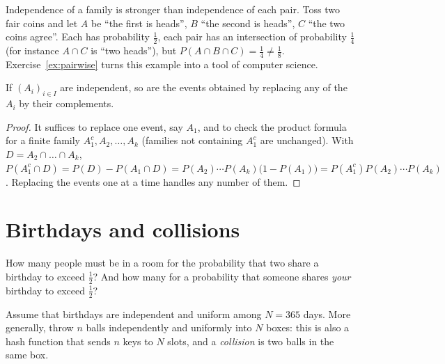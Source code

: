 Independence of a family is stronger than independence of each pair. Toss two fair coins and let $A$ be ``the
first is heads'', $B$ ``the second is heads'', $C$ ``the two coins agree''. Each has probability $\frac12$, each
pair has an intersection of probability $\frac14$ (for instance $A\cap C$ is ``two heads''), but
$P(A\cap B\cap C)=\frac14\ne\frac18$. Exercise~\ref{ex:pairwise} turns this example into a tool of computer
science.

\begin{proposition}\label{prop:indepcomp}
If $(A_i)_{i\in I}$ are independent, so are the events obtained by replacing any of the $A_i$ by their
complements.
\end{proposition}
\begin{proof}
It suffices to replace one event, say $A_1$, and to check the product formula for a finite family
$A_1^c,A_2,\dots,A_k$ (families not containing $A_1^c$ are unchanged). With $D=A_2\cap\dots\cap A_k$,
$P(A_1^c\cap D)=P(D)-P(A_1\cap D)=P(A_2)\cdots P(A_k)\bigl(1-P(A_1)\bigr)=P(A_1^c)P(A_2)\cdots P(A_k)$. Replacing
the events one at a time handles any number of them.
\end{proof}

\section{Birthdays and collisions}

\begin{think}
How many people must be in a room for the probability that two share a birthday to exceed $\frac12$? And how many
for a probability that someone shares \emph{your} birthday to exceed $\frac12$?
\end{think}

Assume that birthdays are independent and uniform among $N=365$ days. More generally, throw $n$ balls
independently and uniformly into $N$ boxes: this is also a hash function that sends $n$ keys to $N$ slots, and a
\emph{collision} is two balls in the same box.


